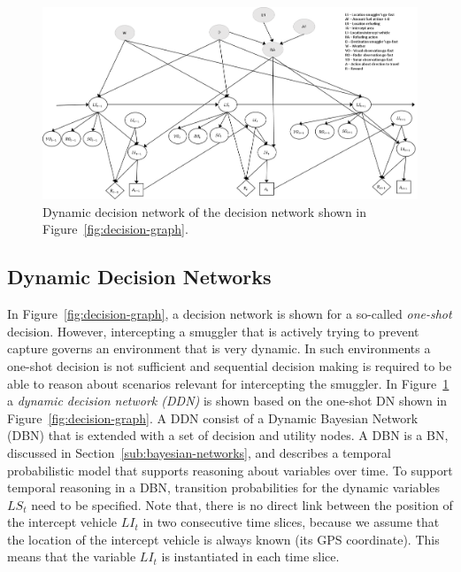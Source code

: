 \documentclass[conference]{IEEEtran}
\begin{document}
\begin{figure}[!t]
\begin{center}
 \includegraphics[width=.95\textwidth]{img/dynamic-decision-graph.png}
 \caption{Dynamic decision network of the decision network shown in Figure~\ref{fig:decision-graph}.}\label{fig:ddn} 
\end{center}
\end{figure}


\subsection{Dynamic Decision Networks}
\label{sub:dyn-dec-net}

In Figure~\ref{fig:decision-graph}, a decision network is shown for a so-called \emph{one-shot} decision. However, intercepting a smuggler that is actively trying to prevent capture governs an environment that is very dynamic. In such environments a one-shot decision is not sufficient and sequential decision making is required to be able to reason about scenarios relevant for intercepting the smuggler. In Figure~\ref{fig:ddn} a {\em dynamic decision network (DDN)} is shown based on the one-shot DN shown in Figure~\ref{fig:decision-graph}. A DDN consist of a Dynamic Bayesian Network (DBN) \cite{murphy02phdthesis} that is extended with a set of decision and utility nodes. A DBN is a BN, discussed in Section~\ref{sub:bayesian-networks}, and describes a temporal probabilistic model that supports reasoning about variables over time. To support temporal reasoning in a DBN, transition probabilities for the dynamic variables $LS_t$ need to be specified. Note that, there is no direct link between the position of the intercept vehicle $LI_t$ in two consecutive time slices, because we assume that the location of the intercept vehicle is always known (\ie its GPS coordinate). This means that the variable $LI_t$ is instantiated in each time slice.
\end{document}
